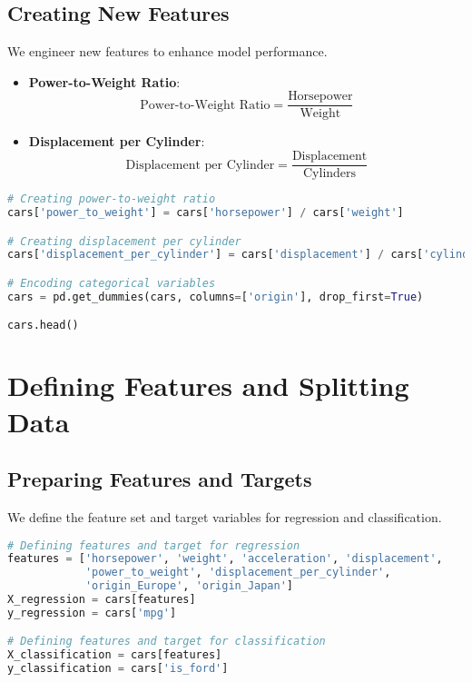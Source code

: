 \documentclass{article}
\begin{document}
\subsection{Creating New Features}

We engineer new features to enhance model performance.

\begin{itemize}
    \item \textbf{Power-to-Weight Ratio}:
    \[
    \text{Power-to-Weight Ratio} = \frac{\text{Horsepower}}{\text{Weight}}
    \]
    \item \textbf{Displacement per Cylinder}:
    \[
    \text{Displacement per Cylinder} = \frac{\text{Displacement}}{\text{Cylinders}}
    \]
\end{itemize}

\begin{lstlisting}[language=Python]
# Creating power-to-weight ratio
cars['power_to_weight'] = cars['horsepower'] / cars['weight']

# Creating displacement per cylinder
cars['displacement_per_cylinder'] = cars['displacement'] / cars['cylinders']

# Encoding categorical variables
cars = pd.get_dummies(cars, columns=['origin'], drop_first=True)

cars.head()
\end{lstlisting}

\section{Defining Features and Splitting Data}

\subsection{Preparing Features and Targets}

We define the feature set and target variables for regression and classification.

\begin{lstlisting}[language=Python]
# Defining features and target for regression
features = ['horsepower', 'weight', 'acceleration', 'displacement', 
            'power_to_weight', 'displacement_per_cylinder', 
            'origin_Europe', 'origin_Japan']
X_regression = cars[features]
y_regression = cars['mpg']

# Defining features and target for classification
X_classification = cars[features]
y_classification = cars['is_ford']
\end{lstlisting}
\end{document}
